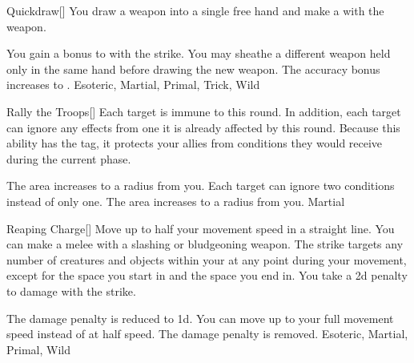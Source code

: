 \lowercase{\hypertarget{maneuver:Quickdraw}{}}\label{maneuver:Quickdraw}
\hypertarget{maneuver:Quickdraw}{}
\begin{freeability}[Rank 1]{Quickdraw}[]
You draw a weapon into a single free hand and make a  with the weapon.

\rankline
{} You gain a  bonus to  with the strike.
 You may sheathe a different weapon held only in the same hand before drawing the new weapon.
 The accuracy bonus increases to .
 Esoteric, Martial, Primal, Trick, Wild
\end{freeability}
\vspace{0.25em}



\lowercase{\hypertarget{maneuver:Rally the Troops}{}}\label{maneuver:Rally the Troops}
\hypertarget{maneuver:Rally the Troops}{}
\begin{freeability}[Rank 1]{Rally the Troops}[]
Each target is immune to  this round.
In addition, each target can ignore any effects from one  it is already affected by this round.
Because this ability has the  tag, it protects your allies from conditions they would receive during the current phase.

\rankline
{} The area increases to a \arealarge radius from you.
 Each target can ignore two conditions instead of only one.
 The area increases to a \areahuge radius from you.
 Martial
\end{freeability}
\vspace{0.25em}



\lowercase{\hypertarget{maneuver:Reaping Charge}{}}\label{maneuver:Reaping Charge}
\hypertarget{maneuver:Reaping Charge}{}
\begin{freeability}[Rank 1]{Reaping Charge}[]
Move up to half your movement speed in a straight line.
You can make a melee  with a slashing or bludgeoning weapon.
The strike targets any number of creatures and objects within your  at any point during your movement, except for the space you start in and the space you end in.
You take a \minus2d penalty to damage with the strike.

\rankline
{} The damage penalty is reduced to \minus1d.
 You can move up to your full movement speed instead of at half speed.
 The damage penalty is removed.
 Esoteric, Martial, Primal, Wild
\end{freeability}
\vspace{0.25em}



